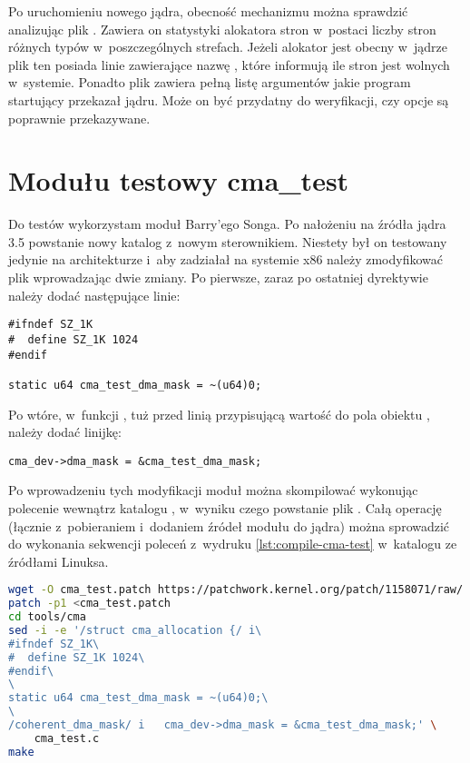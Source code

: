 Po uruchomieniu nowego jądra, obecność mechanizmu  można
sprawdzić analizując plik .  Zawiera on
statystyki alokatora stron w~postaci liczby stron różnych typów
w~poszczególnych strefach.  Jeżeli alokator  jest obecny
w~jądrze plik ten posiada linie zawierające nazwę , które
informują ile stron  jest wolnych w~systemie.  Ponadto plik
 zawiera pełną listę argumentów jakie program
startujący przekazał jądru.  Może on być przydatny do weryfikacji, czy
opcje są poprawnie przekazywane.


\section{Modułu testowy cma\_test}

Do testów  wykorzystam moduł Barry'ego Songa.  Po nałożeniu
\autocite{patch:cma-test} na źródła jądra 3.5 powstanie nowy katalog
 z~nowym sterownikiem.  Niestety był on testowany
jedynie na architekturze  i~aby zadziałał na systemie x86
należy zmodyfikować plik  wprowadzając dwie zmiany.
Po pierwsze, zaraz po ostatniej dyrektywie  należy
dodać następujące linie:

\begin{lstlisting}[numbers=none]
#ifndef SZ_1K
#  define SZ_1K 1024
#endif

static u64 cma_test_dma_mask = ~(u64)0;
\end{lstlisting}

Po wtóre, w~funkcji , tuż przed linią przypisującą
wartość do pola  obiektu ,
należy dodać linijkę:

\begin{lstlisting}[numbers=none]
	cma_dev->dma_mask = &cma_test_dma_mask;
\end{lstlisting}

Po wprowadzeniu tych modyfikacji moduł można skompilować wykonując
polecenie  wewnątrz katalogu , w~wyniku
czego powstanie plik .  Całą operację (łącznie
z~pobieraniem i~dodaniem źródeł modułu do jądra) można sprowadzić do
wykonania sekwencji poleceń z~wydruku \ref{lst:compile-cma-test}
w~katalogu ze źródłami Linuksa.

\begin{lstlisting}[float=tb,caption=Sekwencja komend dodająca
    i~budująca moduł \code{cma_test}.,label=lst:compile-cma-test,
    language=sh,numbers=none,columns=fullflexible]
wget -O cma_test.patch https://patchwork.kernel.org/patch/1158071/raw/
patch -p1 <cma_test.patch
cd tools/cma
sed -i -e '/struct cma_allocation {/ i\
#ifndef SZ_1K\
#  define SZ_1K 1024\
#endif\
\
static u64 cma_test_dma_mask = ~(u64)0;\
\
/coherent_dma_mask/ i	cma_dev->dma_mask = &cma_test_dma_mask;' \
    cma_test.c
make
\end{lstlisting}

